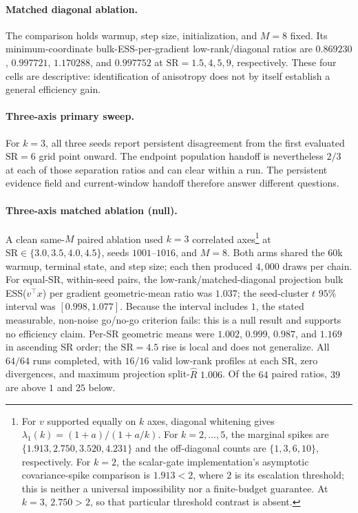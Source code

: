 \documentclass[11pt]{article}
\theoremstyle{plain}
\theoremstyle{definition}
\theoremstyle{remark}
\newcommand{\Rhat}{\widehat R}
\begin{document}
\paragraph{Matched diagonal ablation.}
The comparison holds warmup, step size, initialization, and $M=8$ fixed. Its
minimum-coordinate bulk-ESS-per-gradient low-rank/diagonal ratios are
$0.869230$, $0.997721$, $1.170288$, and $0.997752$ at
$\mathrm{SR}=1.5,4,5,9$, respectively. These four cells are descriptive:
identification of anisotropy does not by itself establish a general efficiency
gain.

\paragraph{Three-axis primary sweep.}
For $k=3$, all three seeds report persistent disagreement from the first
evaluated $\mathrm{SR}=6$ grid point onward. The endpoint population handoff is
nevertheless $2/3$ at each of those separation ratios and can clear within a
run. The persistent evidence field and current-window handoff therefore answer
different questions.

\paragraph{Three-axis matched ablation (null).}
A clean same-$M$ paired ablation used $k=3$ correlated axes\footnote{For
$v$ supported equally on $k$ axes, diagonal whitening gives
$\lambda_1(k)=(1+a)/(1+a/k)$. For $k=2,\ldots,5$, the marginal spikes are
$\{1.913,2.750,3.520,4.231\}$ and the off-diagonal counts are
$\{1,3,6,10\}$, respectively. For $k=2$, the scalar-gate implementation's
asymptotic covariance-spike comparison is $1.913<2$, where $2$ is its
escalation threshold; this is neither a universal impossibility nor a
finite-budget guarantee. At $k=3$, $2.750>2$, so that particular threshold
contrast is absent.} at
$\mathrm{SR}\in\{3.0,3.5,4.0,4.5\}$, seeds $1001$--$1016$, and $M=8$.
Both arms shared the $60$k warmup, terminal state, and step size; each then
produced $4{,}000$ draws per chain. For equal-SR, within-seed pairs, the
low-rank/matched-diagonal projection bulk ESS($v^\top x$) per gradient
geometric-mean ratio was $1.037$; the seed-cluster $t$ $95\%$ interval was
$[0.998,1.077]$. Because the interval includes $1$, the stated
measurable, non-noise go/no-go criterion fails: this is a null result and
supports no efficiency claim. Per-SR geometric means were $1.002$,
$0.999$, $0.987$, and $1.169$ in ascending SR order; the
$\mathrm{SR}=4.5$ rise is local and does not generalize. All $64/64$ runs
completed, with $16/16$ valid low-rank profiles at each SR, zero divergences,
and maximum projection split-$\Rhat$ $1.006$. Of the $64$ paired ratios,
$39$ are above $1$ and $25$ below.
\end{document}
